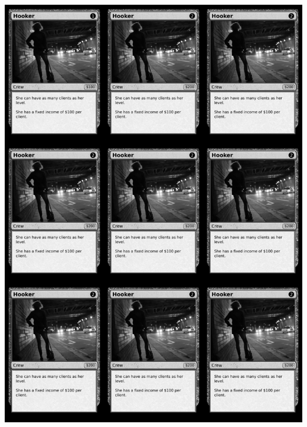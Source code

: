 \documentclass[a4paper]{article}
\begin{document}
\begin{center}
	\centering
	\includegraphics[width=190.5mm,height=266.7mm]{output/temp/page14.png}
\end{center}

\newpage
\end{document}
